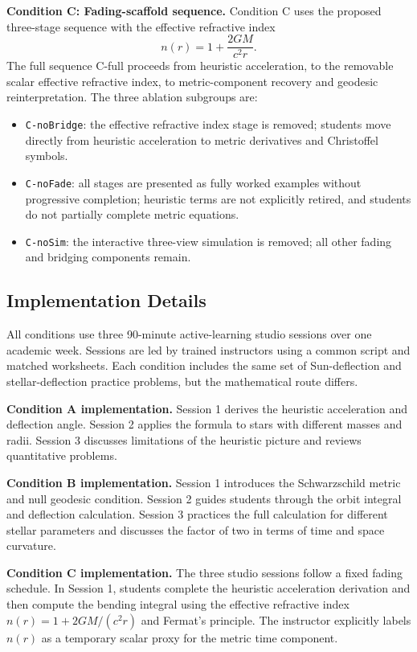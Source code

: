 \documentclass{article}
\begin{document}
\textbf{Condition C: Fading-scaffold sequence.} Condition C uses the proposed three-stage sequence with the effective refractive index
\[
n(r) = 1 + \frac{2GM}{c^{2}r}.
\]
The full sequence C-full proceeds from heuristic acceleration, to the removable scalar effective refractive index, to metric-component recovery and geodesic reinterpretation. The three ablation subgroups are:
\begin{itemize}
\item \texttt{C-noBridge}: the effective refractive index stage is removed; students move directly from heuristic acceleration to metric derivatives and Christoffel symbols.
\item \texttt{C-noFade}: all stages are presented as fully worked examples without progressive completion; heuristic terms are not explicitly retired, and students do not partially complete metric equations.
\item \texttt{C-noSim}: the interactive three-view simulation is removed; all other fading and bridging components remain.
\end{itemize}

\subsection{Implementation Details}

All conditions use three 90-minute active-learning studio sessions over one academic week. Sessions are led by trained instructors using a common script and matched worksheets. Each condition includes the same set of Sun-deflection and stellar-deflection practice problems, but the mathematical route differs.

\textbf{Condition A implementation.} Session 1 derives the heuristic acceleration and deflection angle. Session 2 applies the formula to stars with different masses and radii. Session 3 discusses limitations of the heuristic picture and reviews quantitative problems.

\textbf{Condition B implementation.} Session 1 introduces the Schwarzschild metric and null geodesic condition. Session 2 guides students through the orbit integral and deflection calculation. Session 3 practices the full calculation for different stellar parameters and discusses the factor of two in terms of time and space curvature.

\textbf{Condition C implementation.} The three studio sessions follow a fixed fading schedule. In Session 1, students complete the heuristic acceleration derivation and then compute the bending integral using the effective refractive index \(n(r)=1+2GM/(c^{2}r)\) and Fermat's principle. The instructor explicitly labels \(n(r)\) as a temporary scalar proxy for the metric time component.
\end{document}
